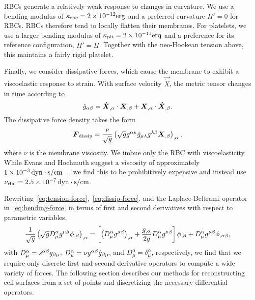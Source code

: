 RBCs generate a relatively weak response to changes in curvature. We use a bending
modulus of $\kappa_\text{rbc} = \scinot{2}{-12}\si{erg}$ and a preferred curvature
$H' = 0$ for RBCs. RBCs therefore tend to locally flatten their membranes. For platelets,
we use a larger bending modulus of $\kappa_\text{plt} = \scinot{2}{-11}\si{erq}$ and
a preference for its reference configuration, $H' = \hat{H}$. Together with the
neo-Hookean tension above, this maintains a fairly rigid platelet.

Finally, we consider dissipative forces, which cause the membrane to exhibit a
viscoelastic response to strain. With surface velocity $\vec{\dot{X}}$, the metric tensor
changes in time according to 
\begin{equation}
    \dot{\metric}_{\alpha\beta} = \vec{\dot{X}}_{,\alpha}\cdot\X_{,\beta} + \X_{,\alpha}\cdot\vec{\dot{X}}_{,\beta}.
\end{equation}
The dissipative force density takes the form~\cite{Rangamani:2012hi}
\begin{equation}\label{eq:dissip-force}
    \F_\text{dissip} = \frac{\nu}{\sqrt{\metric}}\left(\sqrt{\metric}\metric^{\alpha\mu}\dot{\metric}_{\mu\lambda}\metric^{\lambda\beta}\X_{,\beta}\right)_{,\alpha},
\end{equation}
where $\nu$ is the membrane viscosity. We imbue only the RBC with viscoelasticity. While
Evans and Hochmuth suggest a viscosity of approximately $\scinot{1}{-3}\dynsecpercm$~%
\cite{Evans:1976tx}, we find this to be prohibitively expensive and instead use
$\nu_\text{rbc} = \scinot{2.5}{-7}\dynsecpercm$.

Rewriting~\eqref{eq:tension-force},~\eqref{eq:dissip-force}, and the Laplace-Beltrami
operator in~\eqref{eq:bending-force} in terms of first and second derivatives with
respect to parametric variables,
\begin{equation}\label{eq:expanded-op}
    \frac1{\sqrt{\metric}}\left(\sqrt{\metric}D^\alpha_\mu \metric^{\mu\beta}\phi_{,\beta}\right)_{,\alpha}
    = \left[\left(D^\alpha_\mu \metric^{\mu\beta}\right)_{,\alpha} + \frac{\metric_{,\alpha}}{2\metric}D^\alpha_\mu \metric^{\mu\beta}\right]\phi_{,\beta}+D^\alpha_\mu \metric^{\mu\beta}\phi_{,\alpha\beta},
\end{equation}
with $D^\alpha_\mu = s^{\alpha\beta}\metric_{\beta\mu}$,
$D^\alpha_\mu = \nu \metric^{\alpha\beta}\dot{g}_{\beta\mu}$, and
$D^\alpha_\mu = \delta^\alpha_\mu$,
respectively, we find that we require only discrete first and second derivative operators
to compute a wide variety of forces. The following section describes our methods for
reconstructing cell surfaces from a set of points and discretizing the necessary
differential operators.
